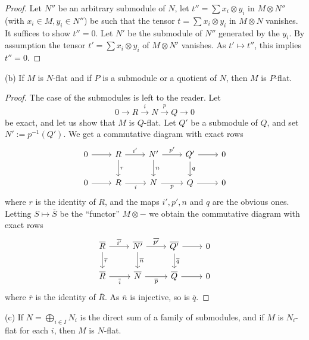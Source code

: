 \documentclass[12pt]{article}
\begin{document}
\begin{proof} 
Let $N''$ be an arbitrary submodule of $N$, let $t''=\sum x_i\otimes y_i$ in $M\otimes N''$ (with $x_i\in M,y_i\in N''$) be such that the tensor $t=\sum x_i\otimes y_i$ in $M\otimes N$ vanishes. It suffices to show $t''=0$. Let $N'$ be the submodule of $N''$ generated by the $y_i$. By assumption the tensor $t'=\sum x_i\otimes y_i$ of $M\otimes N'$ vanishes. As $t'\mapsto t''$, this implies $t''=0$. 
\end{proof}

(b) If $M$ is $N$-flat and if $P$ is a submodule or a quotient of $N$, then $M$ is $P$-flat.%

\begin{proof} 
The case of the submodules is left to the reader. Let 
$$
0\to R\xrightarrow iN\xrightarrow pQ\to0
$$ 
be exact, and let us show that $M$ is $Q$-flat. Let $Q'$ be a submodule of $Q$, and set $N':=p^{-1}(Q')$. We get a commutative diagram with exact rows
$$
\begin{tikzcd}
0\ar[r]&R\ar[d,"r"]\ar[r,"i'"]&N'\ar[d,"n"]\ar[r,"p'"]& Q'\ar[d,"q"]\ar[r]&0\\ 
0\ar[r]&R\ar[r,"i"']&N\ar[r,"p"']& Q\ar[r]&0
\end{tikzcd}
$$ 
where $r$ is the identity of $R$, and the maps $i',p',n$ and $q$ are the obvious ones. Letting $S\mapsto\overline S$ be the ``functor'' $M\otimes-$ we obtain the commutative diagram with exact rows
$$
\begin{tikzcd}
\overline R\ar[d,"\overline r"]\ar[r,"\overline{i'}"]&\overline{N'}\ar[d,"\overline n"]\ar[r,"\overline{p'}"]& \overline{Q'}\ar[d,"\overline q"]\ar[r]&0\\ 
\overline R\ar[r,"\overline i"']&\overline N\ar[r,"\overline p"']& \overline Q\ar[r]&0
\end{tikzcd}
$$ 
where $\overline r$ is the identity of $\overline R$. As $\overline n$ is injective, so is $\overline q$. 
\end{proof}

(c) If $N=\bigoplus_{i\in I}N_i$ is the direct sum of a family of submodules, and if $M$ is $N_i$-flat for each $i$, then $M$ is $N$-flat.%
\end{document}
